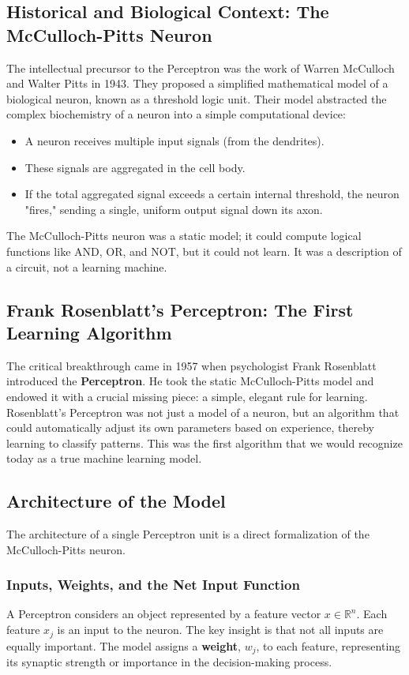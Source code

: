 \subsection*{Historical and Biological Context: The McCulloch-Pitts Neuron}
The intellectual precursor to the Perceptron was the work of Warren McCulloch and Walter Pitts in 1943. They proposed a simplified mathematical model of a biological neuron, known as a threshold logic unit. Their model abstracted the complex biochemistry of a neuron into a simple computational device:
\begin{itemize}
    \item A neuron receives multiple input signals (from the dendrites).
    \item These signals are aggregated in the cell body.
    \item If the total aggregated signal exceeds a certain internal threshold, the neuron "fires," sending a single, uniform output signal down its axon.
\end{itemize}
The McCulloch-Pitts neuron was a static model; it could compute logical functions like AND, OR, and NOT, but it could not learn. It was a description of a circuit, not a learning machine.

\subsection*{Frank Rosenblatt's Perceptron: The First Learning Algorithm}
The critical breakthrough came in 1957 when psychologist Frank Rosenblatt introduced the \textbf{Perceptron}. He took the static McCulloch-Pitts model and endowed it with a crucial missing piece: a simple, elegant rule for learning. Rosenblatt's Perceptron was not just a model of a neuron, but an algorithm that could automatically adjust its own parameters based on experience, thereby learning to classify patterns. This was the first algorithm that we would recognize today as a true machine learning model.

\subsection*{Architecture of the Model}
The architecture of a single Perceptron unit is a direct formalization of the McCulloch-Pitts neuron.

\subsubsection*{Inputs, Weights, and the Net Input Function}
A Perceptron considers an object represented by a feature vector $x \in \mathbb{R}^n$. Each feature $x_j$ is an input to the neuron. The key insight is that not all inputs are equally important. The model assigns a \textbf{weight}, $w_j$, to each feature, representing its synaptic strength or importance in the decision-making process.

